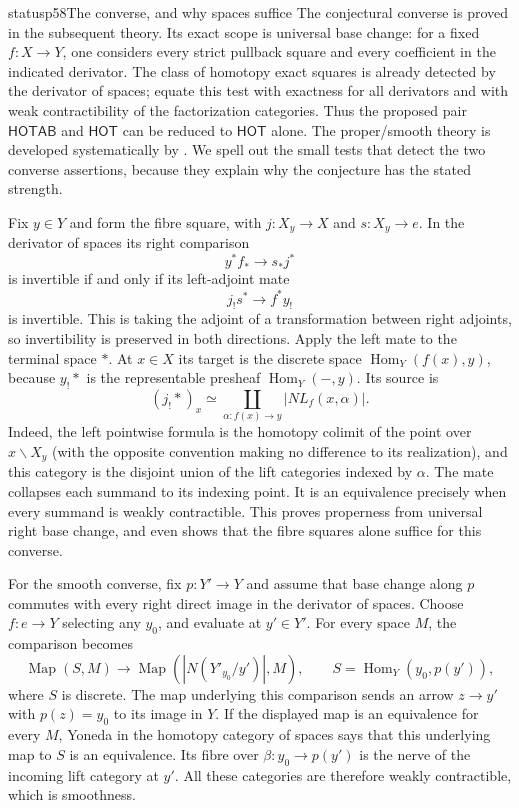\begin{dcomment}{status}{p58}{The converse, and why spaces suffice}
The conjectural converse is proved in the subsequent theory. Its exact scope is universal base change: for a fixed $f:X\to Y$, one considers every strict pullback square and every coefficient in the indicated derivator. The class of homotopy exact squares is already detected by the derivator of spaces; \citet[Theorem~3.16]{GrothPontoShulman2014} equate this test with exactness for all derivators and with weak contractibility of the factorization categories. Thus the proposed pair $\mathsf{HOTAB}$ and $\mathsf{HOT}$ can be reduced to $\mathsf{HOT}$ alone. The proper/smooth theory is developed systematically by \citet[\S3.2]{Maltsiniotis2020}. We spell out the small tests that detect the two converse assertions, because they explain why the conjecture has the stated strength.

Fix $y\in Y$ and form the fibre square, with $j:X_y\to X$ and $s:X_y\to e$. In the derivator of spaces its right comparison
\[
 y^*f_*\longrightarrow s_*j^*
\]
is invertible if and only if its left-adjoint mate
\[
 j_!s^*\longrightarrow f^*y_!
\]
is invertible. This is taking the adjoint of a transformation between right adjoints, so invertibility is preserved in both directions. Apply the left mate to the terminal space $*$. At $x\in X$ its target is the discrete space $\operatorname{Hom}_Y(f(x),y)$, because $y_!*$ is the representable presheaf $\operatorname{Hom}_Y(-,y)$. Its source is
\[
 (j_!*)_x\simeq
 \coprod_{\alpha:f(x)\to y}|N L_f(x,\alpha)|.
\]
Indeed, the left pointwise formula is the homotopy colimit of the point over $x\backslash X_y$ (with the opposite convention making no difference to its realization), and this category is the disjoint union of the lift categories indexed by $\alpha$. The mate collapses each summand to its indexing point. It is an equivalence precisely when every summand is weakly contractible. This proves properness from universal right base change, and even shows that the fibre squares alone suffice for this converse.

For the smooth converse, fix $p:Y'\to Y$ and assume that base change along $p$ commutes with every right direct image in the derivator of spaces. Choose $f:e\to Y$ selecting any $y_0$, and evaluate at $y'\in Y'$. For every space $M$, the comparison becomes
\[
 \operatorname{Map}(S,M)\longrightarrow
 \operatorname{Map}(|N(Y'_{y_0}/y')|,M),
 \qquad S=\operatorname{Hom}_Y(y_0,p(y')),
\]
where $S$ is discrete. The map underlying this comparison sends an arrow $z\to y'$ with $p(z)=y_0$ to its image in $Y$. If the displayed map is an equivalence for every $M$, Yoneda in the homotopy category of spaces says that this underlying map to $S$ is an equivalence. Its fibre over $\beta:y_0\to p(y')$ is the nerve of the incoming lift category at $y'$. All these categories are therefore weakly contractible, which is smoothness.


\end{dcomment}
